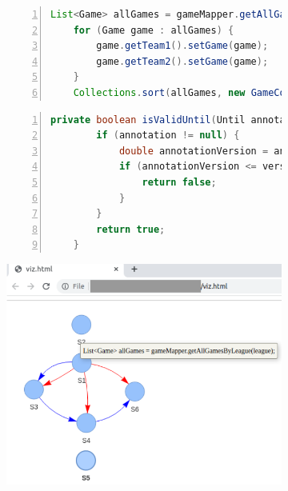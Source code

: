\begin{figure}[hbt!]
\centering
\begin{subfigure}[b]{.4\textwidth}
\begin{lstlisting}[basicstyle=\scriptsize\sffamily, stepnumber=1, numbers=left, numbersep=-6pt, framexleftmargin=0mm, framexrightmargin=0mm, language=Java, emph={allGames}]
    List<Game> allGames = gameMapper.getAllGamesByLeague(league);
    for (Game game : allGames) {
        game.getTeam1().setGame(game);
        game.getTeam2().setGame(game);
    }
    Collections.sort(allGames, new GameComparator());
\end{lstlisting}
\end{subfigure}
\begin{subfigure}[b]{.4\textwidth}
\begin{lstlisting}[basicstyle=\scriptsize\sffamily, stepnumber=1, numbers=left, numbersep=-6pt, framexleftmargin=0mm, framexrightmargin=0mm, language=java, emph={annotationVersion}]
    private boolean isValidUntil(Until annotation) {
        if (annotation != null) {
            double annotationVersion = annotation.value();
            if (annotationVersion <= version) {
                return false;
            }
        }
        return true;
    }
\end{lstlisting}
\end{subfigure}
\begin{subfigure}[b]{.45\textwidth}
  \centering
  \includegraphics[width=0.7\linewidth]{icse23-demo-figures/lst-partial2.png}
  \vspace{0.75cm}
\end{subfigure}
\begin{subfigure}[b]{.45\textwidth}

\end{subfigure}
\end{figure}
